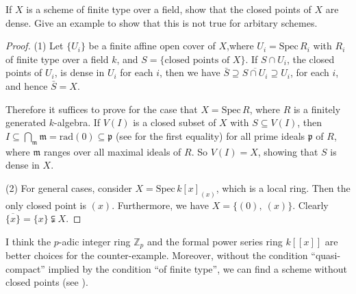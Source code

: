 \begin{exe}
	\label{2.3.14}
	If $X$ is a scheme of finite type over a field, show that the closed points of $X$ are dense. Give an example to show that this is not true for arbitary schemes.
\end{exe}
\begin{proof}
	(1) Let $\{U_i\}$ be a finite affine open cover of $X$,where $U_i=\mathrm{Spec}\,R_i$ with $R_i$ of finite type over a field $k$, and $S=\{
	\text{closed points of }X\}$. If $S\cap U_i$, the closed points of $U_i$, is dense in $U_i$ for each $i$, then we have $\bar{S}\supseteq\overline{S\cap U_i}\supseteq U_i$, for each $i$, and hence $\bar{S}=X$.
	
	Therefore it suffices to prove for the case that $X=\mathrm{Spec}\,R$, where $R$ is a finitely generated $k$-algebra. If $V(I)$ is a closed subset of $X$ with $S\subseteq V(I)$,
	then $I\subseteq\bigcap_{\mathfrak{m}}\mathfrak{m}=\mathrm{rad}(0)\subseteq\mathfrak{p}$ (see \cite[Ch. 1, Ex. 4, P. 11]{ATIY} for the first equality) for all prime ideals $\mathfrak{p}$ of $R$, where $\mathfrak{m}$ ranges over all maximal ideals of $R$. So $V(I)=X$, showing
	that $S$ is dense in $X$.
	
	(2) For general cases, consider $X=\mathrm{Spec}\,k[x]_{(x)}$, which is a local ring. Then the only closed
	point is $(x)$. Furthermore, we have $X=\{(0),\ (x)\}$. Clearly $\overline{\{x\}}=\{x\}\subsetneqq X$.
\end{proof}
\begin{rmk}
	I think the $p$-adic integer ring $\mathbb{Z}_p$ and the formal power series ring $k[[x]]$ are better choices for the counter-example. Moreover, without the condition ``quasi-compact'' implied by the condition ``of finite type'', we can find a scheme without closed points (see \cite[Ch. 3, Ex. 3.27, P. 114]{LIU}).
\end{rmk}
